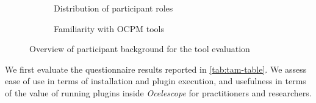 \begin{figure}[h]
	\centering

	\begin{subfigure}[t]{0.48\textwidth}
		\centering
		\caption{Distribution of participant roles}
		\label{fig:role-distribution-pie}
	\end{subfigure}
	\hfill
	\begin{subfigure}[t]{0.48\textwidth}
		\centering
		\caption{Familiarity with OCPM tools}
		\label{fig:ocpm-familiarity-pie}
	\end{subfigure}

	\caption{Overview of participant background for the tool evaluation}
	\label{fig:tool-eval-pies}
\end{figure}

We first evaluate the questionnaire results reported in \autoref{tab:tam-table}. We assess ease of use in terms of installation and plugin execution, and usefulness in terms of the value of running plugins inside \textit{Ocelescope} for practitioners and researchers.

